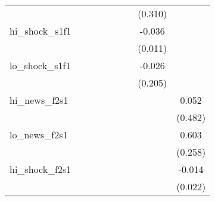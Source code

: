 {\begin{tabular}{l*{8}{c}}
            &                     &                     &                     &                     &                     &                     &     (0.310)         &                     \\
\addlinespace
hi\_shock\_s1f1&                     &                     &                     &                     &                     &                     &      -0.036\sym{***}&                     \\
            &                     &                     &                     &                     &                     &                     &     (0.011)         &                     \\
\addlinespace
lo\_shock\_s1f1&                     &                     &                     &                     &                     &                     &      -0.026         &                     \\
            &                     &                     &                     &                     &                     &                     &     (0.205)         &                     \\
\addlinespace
hi\_news\_f2s1&                     &                     &                     &                     &                     &                     &                     &       0.052         \\
            &                     &                     &                     &                     &                     &                     &                     &     (0.482)         \\
\addlinespace
lo\_news\_f2s1&                     &                     &                     &                     &                     &                     &                     &       0.603\sym{**} \\
            &                     &                     &                     &                     &                     &                     &                     &     (0.258)         \\
\addlinespace
hi\_shock\_f2s1&                     &                     &                     &                     &                     &                     &                     &      -0.014         \\
            &                     &                     &                     &                     &                     &                     &                     &     (0.022)         \\

\end{tabular}}
